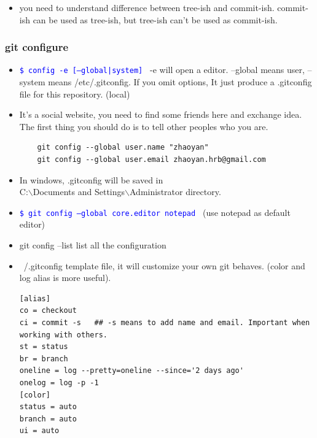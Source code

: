 \documentclass[a4paper,12pt,twoside]{book}
\newcommand{\linuxcommand}[1]{\texttt{\textcolor{blue}{\$ #1 \Pisymbol{psy}{191}}}}
\begin{document}
\begin{itemize}
\begin{itemize}
         \item you need to understand difference between tree-ish and commit-ish. commit-ish can be used as tree-ish, but tree-ish can't be used as commit-ish. 
                 
\end{itemize}

\subsubsection{git configure}
    \begin{itemize}

  \item \linuxcommand{config -e [--global|system]}  -e will open a editor. --global means user, --system means /etc/.gitconfig.   If you omit options, It just produce a .gitconfig file for this repository. (local)

\item It's a social website, you need to find some friends here and exchange idea. The first thing you should do is to tell other peoples who you are.  
    \begin{verbatim}
	git config --global user.name "zhaoyan"
	git config --global user.email zhaoyan.hrb@gmail.com
	\end{verbatim}

    \item In windows, .gitconfig will be saved in  \\
    C:$\backslash$Documents and Settings$\backslash$Administrator directory.
    \item \linuxcommand{git config --global core.editor notepad} (use notepad as default editor)
    \item git config --list list all the configuration
 

\item  ~/.gitconfig template file, it will customize your own git behaves. (color and log
alias is more useful).

\begin{verbatim}
[alias]
co = checkout
ci = commit -s   ## -s means to add name and email. Important when working with others.
st = status
br = branch
oneline = log --pretty=oneline --since='2 days ago'
onelog = log -p -1
[color]
status = auto
branch = auto
ui = auto
\end{verbatim}


\end{itemize}
\end{itemize}
\end{document}
